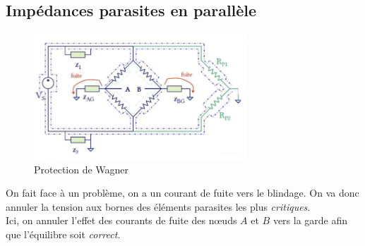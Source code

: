 \documentclass{report}
\begin{document}
\subsection{Impédances parasites en parallèle}
\begin{figure}[H]
\centering
\includegraphics[width=8cm]{img/Wagner.png}
\caption{Protection de Wagner}
\end{figure}
On fait face à un problème, on a un courant de fuite vers le blindage. On va donc annuler la tension aux bornes des éléments parasites les plus \textit{critiques}.\\
Ici, on annuler l'effet des courants de fuite des nœuds $A$ et $B$ vers la garde afin que l'équilibre soit \textit{correct}.
\end{document}
